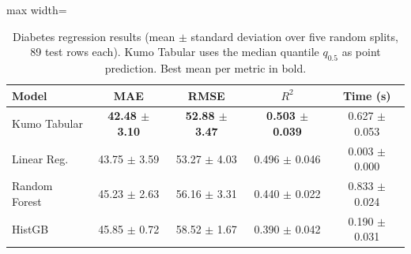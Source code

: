 \begin{table}[t]
\centering
\caption{Diabetes regression results (mean $\pm$ standard deviation over five random splits, 89 test rows each). Kumo Tabular uses the median quantile $q_{0.5}$ as point prediction. Best mean per metric in bold.}
\label{tab:regression}
\setlength{\tabcolsep}{5pt}
\smallskip
\begin{adjustbox}{max width=\textwidth}
\begin{tabular}{lcccc}
\toprule
Model & MAE & RMSE & $R^2$ & Time (s) \\
\midrule
Kumo Tabular & \textbf{42.48 $\pm$ 3.10} & \textbf{52.88 $\pm$ 3.47} & \textbf{0.503 $\pm$ 0.039} & 0.627 $\pm$ 0.053 \\
Linear Reg. & 43.75 $\pm$ 3.59 & 53.27 $\pm$ 4.03 & 0.496 $\pm$ 0.046 & 0.003 $\pm$ 0.000 \\
Random Forest & 45.23 $\pm$ 2.63 & 56.16 $\pm$ 3.31 & 0.440 $\pm$ 0.022 & 0.833 $\pm$ 0.024 \\
HistGB & 45.85 $\pm$ 0.72 & 58.52 $\pm$ 1.67 & 0.390 $\pm$ 0.042 & 0.190 $\pm$ 0.031 \\
\bottomrule
\end{tabular}
\end{adjustbox}
\end{table}
